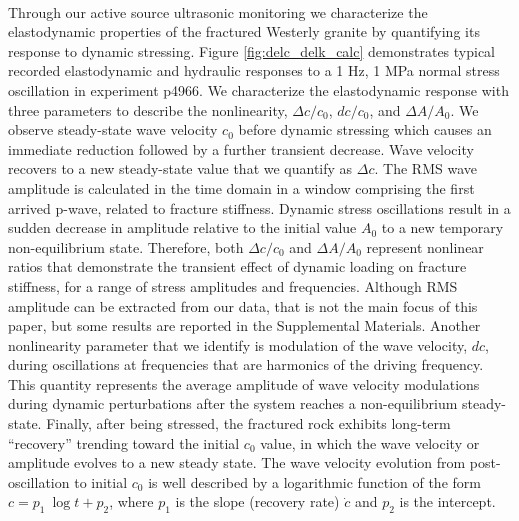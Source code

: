 \documentclass[letterpaper,10pt]{article}
\begin{document}
	\paragraph{}
	Through our active source ultrasonic monitoring we characterize the elastodynamic properties of the fractured Westerly granite by quantifying its response to dynamic stressing. Figure \ref{fig:delc_delk_calc} demonstrates typical recorded elastodynamic and hydraulic responses to a 1 Hz, 1 MPa normal stress oscillation in experiment p4966. We characterize the elastodynamic response with three parameters to describe the nonlinearity, $ \Delta c/c_0 $, $ dc/c_0 $, and $ \Delta A/A_0 $. We observe steady-state wave velocity $ c_0 $ before dynamic stressing which causes an immediate reduction followed by a further transient decrease. Wave velocity recovers to a new steady-state value that we quantify as  $ \Delta c $.
	The RMS wave amplitude is calculated in the time domain in a window comprising the first arrived p-wave, related to fracture stiffness. Dynamic stress oscillations result in a sudden decrease in amplitude relative to the initial value  $ A_0 $ to a new temporary non-equilibrium state. Therefore, both $ \Delta c/c_0 $ and $ \Delta A/A_0 $ represent nonlinear ratios that demonstrate the transient effect of dynamic loading on fracture stiffness, for a range of stress amplitudes and frequencies. Although RMS amplitude can be extracted from our data, that is not the main focus of this paper, but some results are reported in the Supplemental Materials.  
	Another nonlinearity parameter that we identify is modulation of the wave velocity, $ dc $, during oscillations at frequencies that are harmonics of the driving frequency. This quantity represents the average amplitude of wave velocity modulations during dynamic perturbations after the system reaches a non-equilibrium steady-state. Finally, after being stressed, the fractured rock exhibits long-term ``recovery'' trending toward the initial $ c_0 $ value, in which the wave velocity or amplitude evolves to a new steady state. The wave velocity evolution from post-oscillation to initial $ c_0 $ is well described by a logarithmic function of the form $ c = p_1\ \log{t} + p_2 $, where $p_1$ is the slope (recovery rate) $ \dot c $ and $p_2$ is the intercept. 
	
\end{document}
